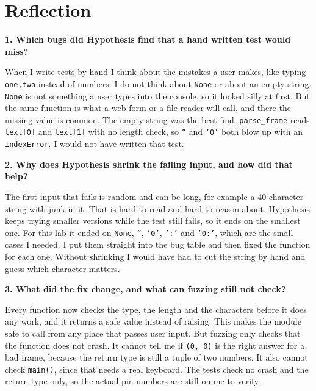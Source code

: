 \documentclass[11pt,a4paper]{article}
\begin{document}
\section*{Reflection}

\noindent\textbf{1. Which bugs did Hypothesis find that a hand written test would miss?}

When I write tests by hand I think about the mistakes a user makes, like typing \texttt{one,two} instead of numbers. I do not think about \texttt{None} or about an empty string. \texttt{None} is not something a user types into the console, so it looked silly at first. But the same function is what a web form or a file reader will call, and there the missing value is common. The empty string was the best find. \texttt{parse\_frame} reads \texttt{text[0]} and \texttt{text[1]} with no length check, so \texttt{''} and \texttt{'0'} both blow up with an \texttt{IndexError}. I would not have written that test.

\bigskip
\noindent\textbf{2. Why does Hypothesis shrink the failing input, and how did that help?}

The first input that fails is random and can be long, for example a 40 character string with junk in it. That is hard to read and hard to reason about. Hypothesis keeps trying smaller versions while the test still fails, so it ends on the smallest one. For this lab it ended on \texttt{None}, \texttt{''}, \texttt{'0'}, \texttt{':'} and \texttt{'0:'}, which are the small cases I needed. I put them straight into the bug table and then fixed the function for each one. Without shrinking I would have had to cut the string by hand and guess which character matters.

\bigskip
\noindent\textbf{3. What did the fix change, and what can fuzzing still not check?}

Every function now checks the type, the length and the characters before it does any work, and it returns a safe value instead of raising. This makes the module safe to call from any place that passes user input. But fuzzing only checks that the function does not crash. It cannot tell me if \texttt{(0, 0)} is the right answer for a bad frame, because the return type is still a tuple of two numbers. It also cannot check \texttt{main()}, since that needs a real keyboard. The tests check no crash and the return type only, so the actual pin numbers are still on me to verify.
\end{document}
